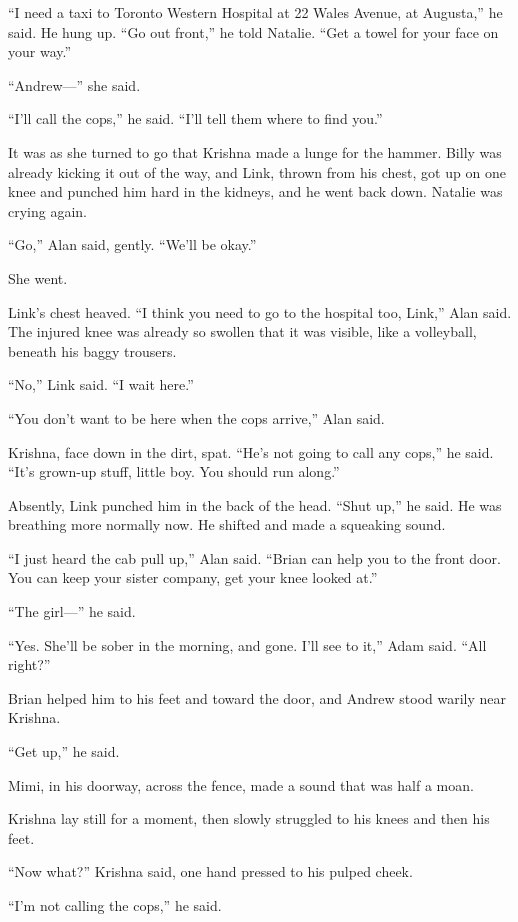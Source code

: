 ``I need a taxi to Toronto Western Hospital at 22 Wales Avenue, at
Augusta,'' he said.  He hung up.  ``Go out front,'' he told Natalie. 
``Get a towel for your face on your way.''

``Andrew---'' she said. 

``I'll call the cops,'' he said.  ``I'll tell them where to find
you.''

It was as she turned to go that Krishna made a lunge for the hammer. 
Billy was already kicking it out of the way, and Link, thrown from his
chest, got up on one knee and punched him hard in the kidneys, and he
went back down.  Natalie was crying again. 

``Go,'' Alan said, gently.  ``We'll be okay.''

She went.

Link's chest heaved.  ``I think you need to go to the hospital too,
Link,'' Alan said.  The injured knee was already so swollen that it
was visible, like a volleyball, beneath his baggy trousers.

``No,'' Link said.  ``I wait here.''

``You don't want to be here when the cops arrive,'' Alan said.

Krishna, face down in the dirt, spat.  ``He's not going to call any
cops,'' he said.  ``It's grown-up stuff, little boy.  You should run
along.''

Absently, Link punched him in the back of the head.  ``Shut up,'' he
said.  He was breathing more normally now.  He shifted and made a
squeaking sound.

``I just heard the cab pull up,'' Alan said.  ``Brian can help you to
the front door.  You can keep your sister company, get your knee
looked at.''

``The girl---'' he said.

``Yes.  She'll be sober in the morning, and gone.  I'll see to it,''
Adam said.  ``All right?''

Brian helped him to his feet and toward the door, and Andrew stood
warily near Krishna.

``Get up,'' he said.

Mimi, in his doorway, across the fence, made a sound that was half a
moan.

Krishna lay still for a moment, then slowly struggled to his knees and
then his feet.

``Now what?'' Krishna said, one hand pressed to his pulped cheek.

``I'm not calling the cops,'' he said.

